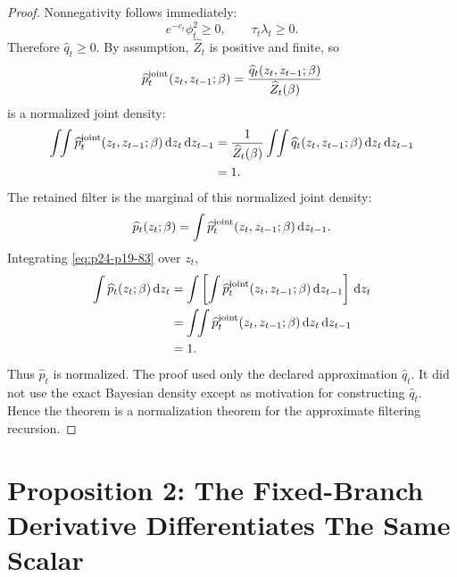 \documentclass[11pt]{article}
\numberwithin{equation}{section}
\newcommand{\dd}{\,\mathrm d}
\begin{document}
\begin{proof}
Nonnegativity follows immediately:
\begin{equation}
    e^{-c_t}\phi_t^2\ge0,
    \qquad
    \tau_t\lambda_t\ge0.
    \label{eq:p24-p19-80}
\end{equation}
Therefore \(\widehat q_t\ge0\).  By assumption,
\(\widehat Z_t\) is positive and finite, so
\begin{equation}
    \widehat p_t^{\rm joint}(z_t,z_{t-1};\beta)
    =
    \frac{\widehat q_t(z_t,z_{t-1};\beta)}
    {\widehat Z_t(\beta)}
    \label{eq:p24-p19-81}
\end{equation}
is a normalized joint density:
\begin{equation}
\begin{aligned}
    \int\!\!\int
    \widehat p_t^{\rm joint}(z_t,z_{t-1};\beta)
    \dd z_t\dd z_{t-1}
    &=
    \frac{1}{\widehat Z_t(\beta)}
    \int\!\!\int
    \widehat q_t(z_t,z_{t-1};\beta)
    \dd z_t\dd z_{t-1}\\
    &=
    1.
\end{aligned}
\label{eq:p24-p19-82}
\end{equation}
The retained filter is the marginal of this normalized joint density:
\begin{equation}
    \widehat p_t(z_t;\beta)
    =
    \int
    \widehat p_t^{\rm joint}(z_t,z_{t-1};\beta)
    \dd z_{t-1}.
    \label{eq:p24-p19-83}
\end{equation}
Integrating \eqref{eq:p24-p19-83} over \(z_t\),
\begin{equation}
\begin{aligned}
    \int \widehat p_t(z_t;\beta)\dd z_t
    &=
    \int
    \left[
    \int \widehat p_t^{\rm joint}(z_t,z_{t-1};\beta)
    \dd z_{t-1}
    \right]\dd z_t\\
    &=
    \int\!\!\int
    \widehat p_t^{\rm joint}(z_t,z_{t-1};\beta)
    \dd z_t\dd z_{t-1}\\
    &=
    1.
\end{aligned}
\label{eq:p24-p19-84}
\end{equation}
Thus \(\widehat p_t\) is normalized.  The proof used only the declared
approximation \(\widehat q_t\).  It did not use the exact Bayesian density
except as motivation for constructing \(\widehat q_t\).  Hence the theorem is a
normalization theorem for the approximate filtering recursion.
\end{proof}

\section{Proposition 2: The Fixed-Branch Derivative Differentiates The Same Scalar}
\end{document}
